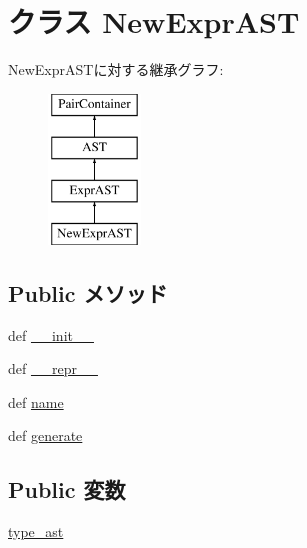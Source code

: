 \hypertarget{classslicc_1_1ast_1_1NewExprAST_1_1NewExprAST}{
\section{クラス NewExprAST}
\label{classslicc_1_1ast_1_1NewExprAST_1_1NewExprAST}
}
NewExprASTに対する継承グラフ:\begin{figure}[H]
\begin{center}
\leavevmode
\includegraphics[height=4cm]{classslicc_1_1ast_1_1NewExprAST_1_1NewExprAST}
\end{center}
\end{figure}
\subsection*{Public メソッド}
\begin{DoxyCompactItemize}
\item 
def \hyperlink{classslicc_1_1ast_1_1NewExprAST_1_1NewExprAST_ac775ee34451fdfa742b318538164070e}{\_\-\_\-init\_\-\_\-}
\item 
def \hyperlink{classslicc_1_1ast_1_1NewExprAST_1_1NewExprAST_ad8b9328939df072e4740cd9a63189744}{\_\-\_\-repr\_\-\_\-}
\item 
def \hyperlink{classslicc_1_1ast_1_1NewExprAST_1_1NewExprAST_a757840459670ee7692e00cf5ddc722d5}{name}
\item 
def \hyperlink{classslicc_1_1ast_1_1NewExprAST_1_1NewExprAST_a4555d1cee0dccf3942ea35fe86de2e8e}{generate}
\end{DoxyCompactItemize}
\subsection*{Public 変数}
\begin{DoxyCompactItemize}
\item 
\hyperlink{classslicc_1_1ast_1_1NewExprAST_1_1NewExprAST_a2c41e611550596541faa6f64ffecc139}{type\_\-ast}
\end{DoxyCompactItemize}


